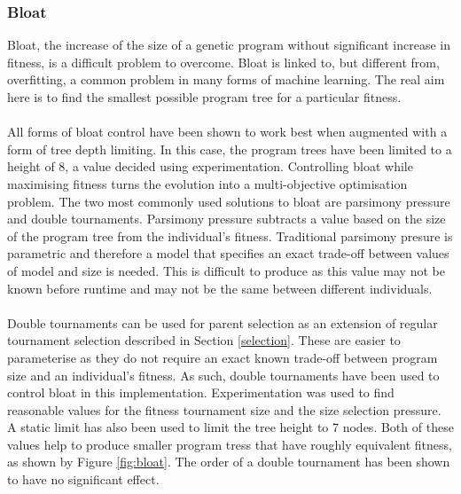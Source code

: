 \documentclass[12pt]{article}
\begin{document}
\subsubsection{Bloat}%
Bloat, the increase of the size of a genetic program without significant increase in fitness, is a difficult problem to overcome. Bloat is linked to, but different from, overfitting, a common problem in many forms of machine learning\cite{measuring_bloat}. The real aim here is to find the smallest possible program tree for a particular fitness.
\\\\
All forms of bloat control have been shown to work best when augmented with a form of tree depth limiting\cite{parsimony_pressure, bloat_comparison}. In this case, the program trees have been limited to a height of 8, a value decided using experimentation. Controlling bloat while maximising fitness turns the evolution into a multi-objective optimisation problem. The two most commonly used solutions to bloat are parsimony pressure and double tournaments. Parsimony pressure subtracts a value based on the size of the program tree from the individual's fitness. Traditional parsimony presure is parametric and therefore a model that specifies an exact trade-off between values of model and size is needed. This is difficult to produce as this value may not be known before runtime and may not be the same between different individuals\cite{parsimony_pressure}. 
\\\\
Double tournaments can be used for parent selection as an extension of regular tournament selection described in Section \ref{selection}. These are easier to parameterise as they do not require an exact known trade-off between program size and an individual's fitness. As such, double tournaments have been used to control bloat in this implementation. Experimentation was used to find reasonable values for the fitness tournament size and the size selection pressure. A static limit has also been used to limit the tree height to 7 nodes. Both of these values help to produce smaller program tress that have roughly equivalent fitness, as shown by Figure \ref{fig:bloat}. The order of a double tournament has been shown to have no significant effect\cite{parsimony_pressure}.%
\end{document}
